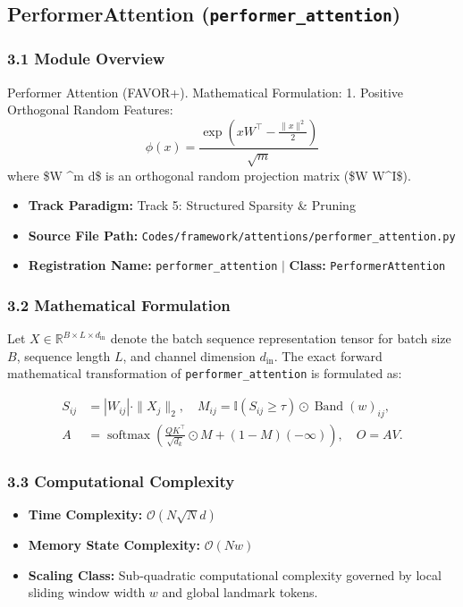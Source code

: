 \subsection{PerformerAttention (\texttt{performer\_attention})}
\label{sec:app_module_performer_attention}

\subsubsection*{3.1 Module Overview}
Performer Attention (FAVOR+).  Mathematical Formulation:     1. Positive Orthogonal Random Features:        $$\phi(x) = \frac{\exp\left(x W^\top - \frac{\|x\|^2}{2}\right)}{\sqrt{m}}$$        where \$W \in {}^{m \times d}\$ is an orthogonal random projection matrix (\$W W^\top \approx I\$).
\begin{itemize}
    \item \textbf{Track Paradigm:} Track 5: Structured Sparsity & Pruning
    \item \textbf{Source File Path:} \texttt{Codes/framework/attentions/performer\_attention.py}
    \item \textbf{Registration Name:} \texttt{performer\_attention} $\mid$ \textbf{Class:} \texttt{PerformerAttention}
\end{itemize}

\subsubsection*{3.2 Mathematical Formulation}
Let $X \in \mathbb{R}^{B \times L \times d_{\text{in}}}$ denote the batch sequence representation tensor for batch size $B$, sequence length $L$, and channel dimension $d_{\text{in}}$. The exact forward mathematical transformation of \texttt{performer\_attention} is formulated as:

\begin{align}
S_{ij} &= |W_{ij}| \cdot \|X_j\|_2, \quad M_{ij} = \mathbb{I}(S_{ij} \ge \tau) \odot \operatorname{Band}(w)_{ij}, \\
A &= \operatorname{softmax}\left(\frac{Q K^\top}{\sqrt{d_k}} \odot M + (1 - M)(-\infty)\right), \quad O = A V.
\end{align}


\subsubsection*{3.3 Computational Complexity}
\begin{itemize}
    \item \textbf{Time Complexity:} $\mathcal{O}(N \sqrt{N} d)$
    \item \textbf{Memory State Complexity:} $\mathcal{O}(N w)$
    \item \textbf{Scaling Class:} Sub-quadratic computational complexity governed by local sliding window width $w$ and global landmark tokens.
\end{itemize}

